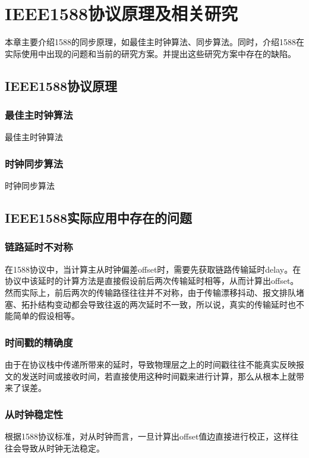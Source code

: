 
\chapter{IEEE1588协议原理及相关研究}
\label{chap:1588_theory}
本章主要介绍1588的同步原理，如最佳主时钟算法、同步算法。同时，介绍1588在实际使用中出现的问题和当前的研究方案。并提出这些研究方案中存在的缺陷。

\section{IEEE1588协议原理}

\subsection{最佳主时钟算法}
\label{sec:1588_theory_bmc}
最佳主时钟算法

\subsection{时钟同步算法}
\label{sec:1588_theory_sync}
时钟同步算法

\section{IEEE1588实际应用中存在的问题}
\subsection{链路延时不对称}
\label{sec:1588_problem_1}
在1588协议中，当计算主从时钟偏差offset时，需要先获取链路传输延时delay。在协议中该延时的计算方法是直接假设前后两次传输延时相等，从而计算出offset。然而实际上，前后两次的传输路径往往并不对称，由于传输漂移抖动、报文排队堵塞、拓扑结构变动都会导致往返的两次延时不一致，所以说，真实的传输延时也不能简单的假设相等。

\subsection{时间戳的精确度}
\label{sec:1588_problem_2}
由于在协议栈中传递所带来的延时，导致物理层之上的时间戳往往不能真实反映报文的发送时间或接收时间，若直接使用这种时间戳来进行计算，那么从根本上就带来了误差。

\subsection{从时钟稳定性}
\label{sec:1588_problem_3}
根据1588协议标准，对从时钟而言，一旦计算出offset值边直接进行校正，这样往往会导致从时钟无法稳定。




